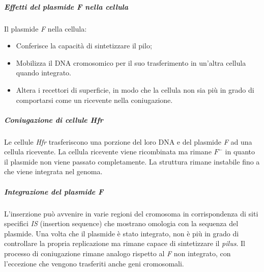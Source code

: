 				\subparagraph{Effetti del plasmide \emph{F} nella cellula}
				Il plasmide \emph{F} nella cellula:
				\begin{multicols}{2}
					\begin{itemize}
    						\item Conferisce la capacit\`a di sintetizzare il pilo; 
    						\item Mobilizza il DNA cromosomico per il suo trasferimento in un'altra cellula quando integrato.
    						\item Altera i recettori di superficie, in modo che la cellula non sia più in grado di comportarsi come un ricevente nella coniugazione. 
					\end{itemize}
				\end{multicols}

				\subparagraph{Coniugazione di cellule \emph{Hfr}}
				Le cellule \emph{Hfr} trasferiscono una porzione del loro DNA e del plasmide \emph{F} ad una cellula ricevente.
				La cellula ricevente viene ricombinata ma rimane \emph{$F^{-}$} in quanto il plasmide non viene passato completamente.
				La struttura rimane instabile fino a che viene integrata nel genoma.

				\subparagraph{Integrazione del plasmide F}
				L'inserzione può avvenire in varie regioni del cromosoma in corrispondenza di siti specifici \emph{IS} (insertion sequence) che mostrano omologia con la sequenza del plasmide. 
				Una volta che il plasmide è stato integrato, non è più in grado di controllare la propria replicazione ma rimane capace di sintetizzare il \emph{pilus}. 
       				Il processo di coniugazione rimane analogo rispetto al \emph{F} non integrato, con l'eccezione che vengono trasferiti anche geni cromosomali.

